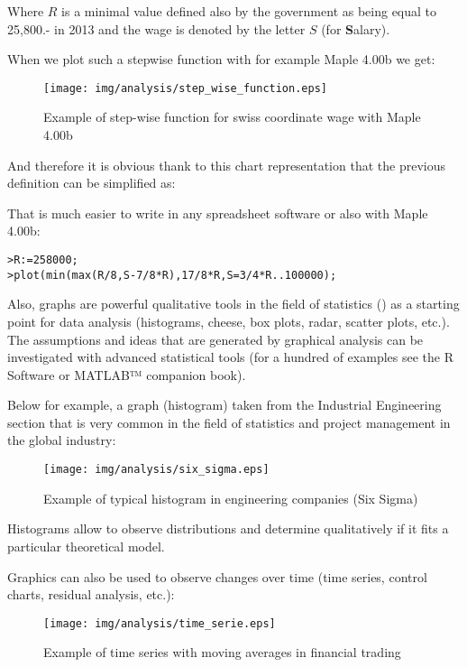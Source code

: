 	

Where $R$ is a minimal value defined also by the government as being equal to 25,800.- in 2013 and the wage is denoted by the letter $S$ (for \textbf{S}alary).

When we plot such a stepwise function with for example Maple 4.00b we get:

\begin{figure}[H]
\centering
\texttt{[image: img/analysis/step\_wise\_function.eps]}
\caption{Example of step-wise function for swiss coordinate wage with Maple 4.00b}
\end{figure}

And therefore it is obvious thank to this chart representation that the previous definition can be simplified as:

	

	That is much easier to write in any spreadsheet software or also with Maple 4.00b:

\texttt{>R:=258000;}\\
\texttt{>plot(min(max(R/8,S-7/8*R),17/8*R,S=3/4*R..100000);}

Also, graphs are powerful qualitative tools in the field of statistics () as a starting point for data analysis (histograms, cheese, box plots, radar, scatter plots, etc.). The assumptions and ideas that are generated by graphical analysis can be investigated with advanced statistical tools (for a hundred of examples see the R Software or MATLAB™ companion book).

Below for example, a graph (histogram) taken from the Industrial Engineering section that is very common in the field of statistics and project management in the global industry:

\begin{figure}[H]
\centering
\texttt{[image: img/analysis/six\_sigma.eps]}
\caption{Example of typical histogram in engineering companies (Six Sigma)}
\end{figure}

Histograms allow to observe distributions and determine qualitatively if it fits a particular theoretical model.

Graphics can also be used to observe changes over time (time series, control charts, residual analysis, etc.):

\begin{figure}[H]
\centering
\texttt{[image: img/analysis/time\_serie.eps]}
\caption{Example of time series with moving averages in financial trading}
\end{figure}

